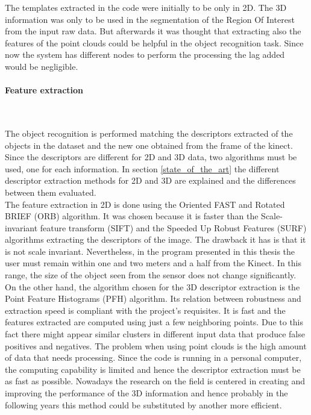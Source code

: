 The templates extracted in the code were initially to be only in 2D. 
The 3D information was only to be used in the segmentation of the Region Of Interest from the input raw data. 
But afterwards it was thought that extracting also the features of the point clouds could be helpful in the object recognition task. 
Since now the system has different nodes to perform the processing the lag added would be negligible. 
\\

\paragraph{Feature extraction}
\mbox{} \\
	\label{feature_extraction}

The object recognition is performed matching the descriptors extracted of the objects in the dataset and the new one obtained from the frame of the kinect. 
Since the descriptors are different for 2D and 3D data, two algorithms must be used, one for each information. 
In section \ref{state_of_the_art} the different descriptor extraction methods for 2D and 3D are explained and the differences between them evaluated. 
\\

The feature extraction in 2D is done using the Oriented FAST and Rotated BRIEF (ORB) \cite{orb} algorithm. 
It was chosen because it is faster than the Scale-invariant feature transform (SIFT)\cite{sift} and the Speeded Up Robust Features (SURF)\cite{surf} algorithms extracting the descriptors of the image. 
The drawback it has is that it is not scale invariant. 
Nevertheless, in the program presented in this thesis the user must remain within one and two meters and a half from the Kinect. 
In this range, the size of the object seen from the sensor does not change significantly. 
\\

On the other hand, the algorithm chosen for the 3D descriptor extraction is the Point Feature Histograms (PFH) \cite{Rusu} algorithm. 
Its relation between robustness and extraction speed is compliant with the project's requisites. It is fast and the features extracted are computed using just a few neighboring points. Due to this fact there might appear similar clusters in different input data that produce false positives and negatives. The problem when using point clouds is the high amount of data that needs processing. Since the code is running in a personal computer, the computing capability is limited and hence the descriptor extraction must be as fast as possible. Nowadays the research on the field is centered in creating and improving the performance of the 3D information and hence probably in the following years this method could be substituted by another more efficient.  
